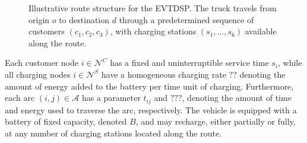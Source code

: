 \documentclass[3p,11pt,authoryear]{elsarticle}  %
\begin{document}
\begin{figure}[htbp!]

\caption{Illustrative route structure for the EVTDSP. The truck travels
from origin $o$ to destination $d$ through a predetermined sequence of
customers $(c_1,c_2,c_3)$, with charging stations $(s_1,\ldots,s_6)$
available along the route.}
\label{fig:evtdsp_route}
\end{figure}

Each customer node $i \in \mathcal{N}^C$ has a fixed and uninterruptible service time $s_i$, while all charging nodes $i \in \mathcal{N}^S$ have a homogeneous charging rate $??$ denoting the amount of energy added to the battery per time unit of charging. Furthermore, each arc $(i,j) \in \mathcal{A}$ has a parameter $t_{ij}$ and $???$, denoting the amount of time and energy used to traverse the arc, respectively.  
The vehicle is equipped with a battery of fixed capacity, denoted $B$, %
and may recharge, either partially or fully, at any number of charging stations located along the route. 
\end{document}
